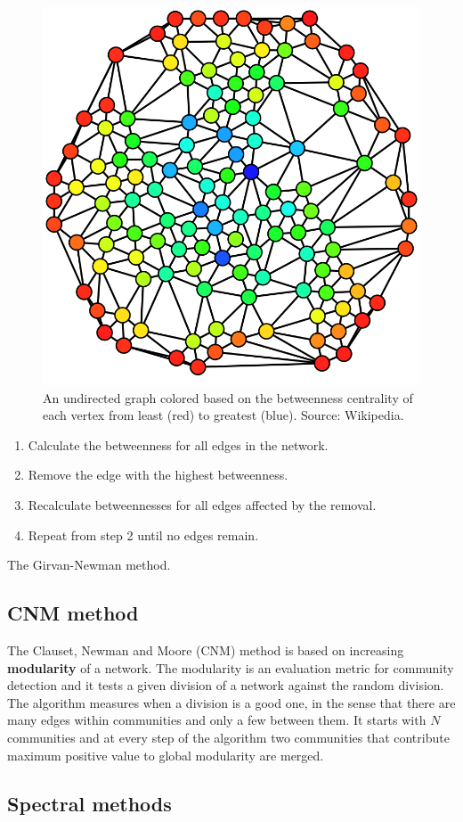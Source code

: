 \documentclass[11pt]{extarticle}
\begin{document}
\begin{figure}[h]
\centering
\includegraphics[width=0.3\linewidth]{figures/graph_betweenness.png}
\caption{An undirected graph colored based on the betweenness centrality of each vertex from least (red) to greatest (blue). Source: Wikipedia.}
\label{girvan_newman}
\end{figure}
\bigskip

\begin{algorithm}[H]
\begin{enumerate}
    \item Calculate the betweenness for all edges in the network.
    \item Remove the edge with the highest betweenness.
    \item Recalculate betweennesses for all edges affected by the removal.
    \item Repeat from step 2 until no edges remain.
\end{enumerate}
\caption{The Girvan-Newman method.}
\end{algorithm}

\subsection{CNM method}

The Clauset, Newman and Moore (CNM) method \cite{cond-mat/0408187} is based on increasing \textbf{modularity} of a network. The modularity is an evaluation metric for community detection and it tests a given division of a network against the random division. The algorithm measures when a division is a good one, in the sense that there are many edges within communities and only a few between them. It starts with $N$ communities and at every step of the algorithm two communities that contribute maximum positive value to global modularity are merged.

\subsection{Spectral methods}
\end{document}
